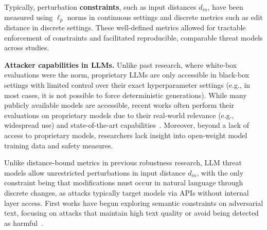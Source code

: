 Typically, perturbation \textbf{constraints}, such as input distances $d_{in}$, have been measured using $\ell_p$ norms in continuous settings and discrete metrics such as edit distance in discrete settings. These well-defined metrics allowed for tractable enforcement of constraints and facilitated reproducible, comparable threat models across studies.

\textbf{Attacker capabilities in LLMs.}
Unlike past research, where white-box evaluations were the norm, proprietary LLMs are only accessible in black-box settings with limited control over their exact hyperparameter settings (e.g., in most cases, it is not possible to force deterministic generations). While many publicly available models are accessible, recent works often perform their evaluations on proprietary models due to their real-world relevance (e.g., widespread use) and state-of-the-art capabilities~\cite{andriushchenko2024jailbreaking}. Moreover, beyond a lack of access to proprietary models, researchers lack insight into open-weight model training data and safety measures.

Unlike distance-bound metrics in previous robustness research, LLM threat models allow unrestricted perturbations in input distance $d_{in}$, with the only constraint being that modifications must occur in natural language through discrete changes, as attacks typically target models via APIs without internal layer access.
First works have begun exploring semantic constraints on adversarial text, focusing on attacks that maintain high text quality or avoid being detected as harmful~\cite{liu2023autodan}.  
\vspace{-5pt}
